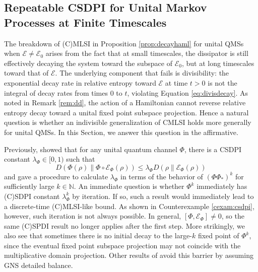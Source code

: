 \documentclass[accepted=2026-02-01, letterpaper]{quantumarticle}
\newcommand{\NN}{\mathbb{N}}
\newcommand{\E}{\mathcal{E}}
\begin{document}
\subsection{Repeatable CSDPI for Unital Markov Processes at Finite Timescales} \label{sec:decayyes}
The breakdown of (C)MLSI in Proposition \ref{prop:decayhaml} for unital QMSs when $\E \neq \E_0$ arises from the fact that at small timescales, the dissipator is still effectively decaying the system toward the subspace of $\E_0$, but at long timescales toward that of $\E$. The underlying component that fails is divisibility: the exponential decay rate in relative entropy toward $\E$ at time $t > 0$ is not the integral of decay rates from times 0 to $t$, violating Equation \eqref{eq:divisdecay}. As noted in Remark \ref{rem:dd}, the action of a Hamiltonian cannot reverse relative entropy decay toward a unital fixed point subspace projection. Hence a natural question is whether an indivisible generalization of CMLSI holds more generally for unital QMSs. In this Section, we answer this question in the affirmative.

Previously, \cite[Theorem 2.6]{gao_complete_2025} showed that for any unital quantum channel $\Phi$, there is a CSDPI constant $\lambda_\Phi \in [0,1)$ such that
\[ D(\Phi(\rho) \| \Phi \circ \E_{\Phi}(\rho)) \leq \lambda_\Phi D(\rho \| \E_{\Phi}(\rho)) \]
and gave a procedure to calculate $\lambda_\Phi$ in terms of the behavior of $(\Phi \Phi_*)^k$ for sufficiently large $k \in \NN$. An immediate question is whether $\Phi^k$ immediately has (C)SDPI constant $\lambda_\Phi^k$ by iteration. If so, such a result would immediately lead to a discrete-time (C)MLSI-like bound. As shown in Counterexample \ref{cexam:csdpi}, however, such iteration is not always possible. In general, $[\Phi, \E_{\Phi}] \neq 0$, so the same (C)SPDI result no longer applies after the first step. More strikingly, we also see that sometimes there is no initial decay to the large-$k$ fixed point of $\Phi^k$, since the eventual fixed point subspace projection may not coincide with the multiplicative domain projection. Other results of \cite{gao_complete_2025} avoid this barrier by assuming GNS detailed balance.
\end{document}
